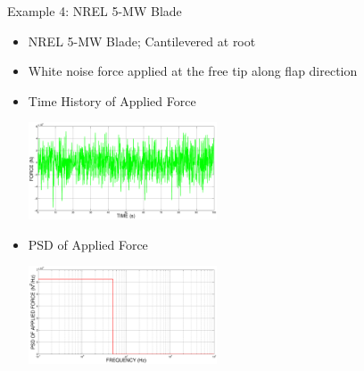 \documentclass[dvips,xcolor=cmyk]{beamer}
\begin{document}
\begin{frame}{Example 4: NREL 5-MW Blade}
\begin{itemize}
    \pause
    \item NREL 5-MW Blade; Cantilevered at root
    \pause
    \item White noise force applied at the free tip along flap direction
    \pause
    \item Time History of Applied Force
    \begin{center}
     \includegraphics[width=2.2in]{EPSF/5MW_Flap_Force_Final.eps}
     \end{center}  
     \pause
      \item PSD of Applied Force
    \begin{center}
     \includegraphics[width=2.2in]{EPSF/5MW_Flap_Force_PSD_Final.eps}
     \end{center}  
\end{itemize}
\end{frame}
\end{document}
